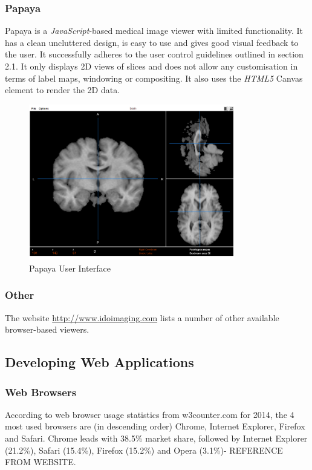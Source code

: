 \documentclass[a4paper,11pt,titlepage]{article}
\begin{document}
\subsubsection{Papaya}
Papaya\cite{papaya} is a \textit{JavaScript}-based medical image viewer with limited functionality. It has a clean uncluttered design, is easy to use and gives good visual feedback to the user. It successfully adheres to the user control guidelines outlined in section 2.1. It only displays 2D views of slices and does not allow any customisation in terms of label maps, windowing or compositing. It also uses the \textit{HTML5} Canvas element to render the 2D data.

\begin{figure}[ht!]
\centering
\includegraphics[width=90mm]{..//literatureSurvey/graphics/webViewer_02.png}
\caption{Papaya User Interface}
\label{fig:UIdesign1}
\end{figure}



\subsubsection{Other}

The website \url{http://www.idoimaging.com} lists a number of other available browser-based viewers.


\subsection{Developing Web Applications}

\subsubsection{Web Browsers}

According to web browser usage statistics from w3counter.com for 2014, the 4 most used
browsers are (in descending order) Chrome, Internet Explorer, Firefox
and Safari. Chrome leads with 38.5\% market share, followed by Internet Explorer (21.2\%), Safari (15.4\%), Firefox (15.2\%) and Opera (3.1\%)- REFERENCE FROM WEBSITE.
\end{document}
